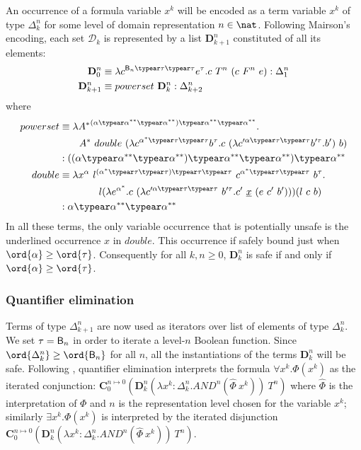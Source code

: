 An occurrence of a formula variable $x^k$ will be encoded as a term variable $x^k$ of type $\Delta_{k}^n$ for some level of domain representation $n\in\nat$.
Following Mairson's  encoding, each set $\mathcal{D}_k$ is represented by a list $\mathbf{D}_{k+1}^n$ constituted of all its elements:
\begin{align*}
\mathbf{D}_0^n &\equiv \lambda c^{\booltype_n \typear \tau \typear \tau} e^\tau . c~T^n~(c~F^n~e) : \Delta_1^n \\
\mathbf{D}_{k+1}^n &\equiv powerset~\mathbf{D}_k^n : \Delta_{k+2}^n
\end{align*}
where
\begin{align*}
  powerset &\equiv \lambda {A^*}^{(\alpha \typear \alpha^{**} \typear \alpha^{**}) \typear \alpha^{**} \typear \alpha^{**}}. \\
&\qquad  A^*~double~(\lambda c^{\alpha^* \typear \tau\typear \tau} b^\tau . c~(\lambda c'^{\alpha\typear \tau\typear \tau} b'^\tau.b')~b)\\
 &: ((\alpha \typear \alpha^{**} \typear \alpha^{**}) \typear \alpha^{**} \typear \alpha^{**})\typear \alpha^{**} \\
  double &\equiv \lambda x^\alpha~l^{(\alpha^* \typear \tau\typear \tau)\typear \tau\typear \tau}~ c^{\alpha^*\typear \tau\typear \tau}~b^\tau. \\
  & \qquad \qquad l(\lambda e^{\alpha^*}.c~(\lambda c'^{\alpha\typear \tau\typear \tau}~ b'^\tau.c'~\underline{x}~(e~c'~b')))(l~c~b)\\
 &: \alpha \typear \alpha^{**} \typear \alpha^{**}
\end{align*}
In all these terms, the only variable occurrence that is potentially unsafe is the underlined occurrence $x$ in $double$. This occurrence if safely bound just when $\ord{\alpha} \geq \ord{\tau}$.
Consequently for all $k,n\geq0$, $\mathbf{D}_k^n$ is safe if and only if $\ord{\alpha} \geq \ord{\tau}$.


\subsubsection{Quantifier elimination}
Terms of type $\Delta_{k+1}^n$ are now used as iterators over list of elements of type $\Delta_k^n$. We set $\tau = \mathsf{B}_n$ in order to iterate a level-$n$ Boolean function. Since $\ord{\Delta_k^n} \geq \ord{\booltype_n}$ for all $n$, all the instantiations of the terms $\mathbf{D}_k^n$ will be safe. Following \cite{mairson1992spt}, quantifier elimination interprets the formula $\forall x^k.\Phi(x^k)$ as the iterated conjunction:
$\mathbf{C}_0^{n\mapsto 0} \left( \mathbf{D}_k^n(\lambda x^k:\Delta_k^n.AND^n(\hat\Phi~x^k))~T^n \right)$ where $\hat\Phi$ is the interpretation of $\Phi$
and $n$ is the representation level chosen for the variable $x^k$; similarly $\exists x^k.\Phi(x^k)$  is interpreted by the iterated disjunction $\mathbf{C}_0^{n\mapsto 0} \left(  \mathbf{D}_k^n(\lambda x^k:\Delta_k^n.AND^n(\hat\Phi~x^k))~T^n\right)$.


